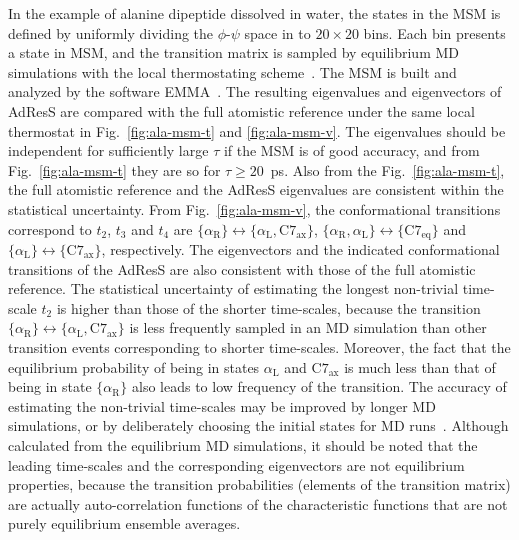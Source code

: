\documentclass[epjST]{svjour}
\newcommand{\recheck}[1]{{\color{red} #1}}
\newcommand{\confa}[0]{{\alpha_{\textrm{R}}}}
\newcommand{\confb}[0]{{\textrm{C}7_{\textrm{eq}}}}
\newcommand{\confc}[0]{{\alpha_{\textrm{L}}}}
\newcommand{\confd}[0]{{\textrm{C}7_{\textrm{ax}}}}
\begin{document}
In the example of alanine dipeptide dissolved in water, the states in the MSM
is defined by uniformly dividing the $\phi$-$\psi$ space in to $20\times 20$ bins.
Each bin presents a state in MSM, and the transition matrix is sampled by equilibrium
MD simulations with the local thermostating scheme~\cite{wang2014exploring}.
The MSM is built and analyzed by the software EMMA~\cite{senne2012emma}.
The resulting eigenvalues and eigenvectors of AdResS are compared with the full atomistic reference under the same local thermostat in
Fig.~\ref{fig:ala-msm-t} and \ref{fig:ala-msm-v}. The
eigenvalues should be independent for sufficiently large $\tau$ if the MSM is of good
accuracy, and from Fig.~\ref{fig:ala-msm-t} they are so for $\tau \geq 20$~ps.
Also from the Fig.~\ref{fig:ala-msm-t}, the full atomistic
reference and the AdResS eigenvalues are consistent within the statistical
uncertainty.
From Fig.~\ref{fig:ala-msm-v}, the conformational transitions correspond
to $t_2$, $t_3$ and $t_4$ are $\{\confa \} \leftrightarrow \{\confc,\confd\}$,
$\{\confa, \confc \} \leftrightarrow \{\confb\}$ and $\{\confc \} \leftrightarrow \{\confd\}$, respectively.
The eigenvectors and the indicated conformational transitions of the AdResS are also consistent with
those of the full atomistic reference.
\recheck{
  The statistical uncertainty of estimating the longest non-trivial time-scale $t_2$ is higher than
  those of the shorter time-scales, because
  the transition $\{\confa \} \leftrightarrow \{\confc,\confd\}$ is less frequently sampled in
  an MD simulation than other transition events corresponding to shorter time-scales.
  Moreover, the fact that the equilibrium probability of being in states $\confc$ and $\confd$ is
  much less than that of being in state $\{\confa \}$ also leads to low frequency of the transition.
  The accuracy of estimating the 
  non-trivial time-scales may be improved by longer MD simulations, 
  or by deliberately choosing the initial states for MD runs~\cite{kohlhoff2014cloud}.}
Although calculated from the
equilibrium MD simulations, it should be noted that the leading time-scales and the
corresponding eigenvectors are not equilibrium properties, because
the transition probabilities (elements of the transition matrix) are actually
auto-correlation functions of the characteristic functions that are not \recheck{purely} equilibrium ensemble averages.
\end{document}
